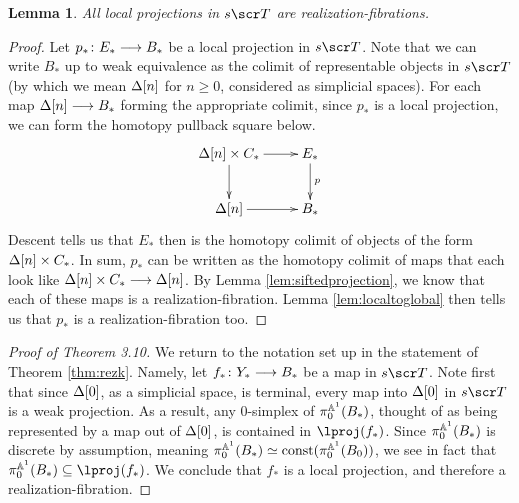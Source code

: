 \documentclass{amsart}
\newtheorem{lem}[thm]{Lemma}
\theoremstyle{definition}
\begin{document}
\begin{lem}
    All local projections in $s\sT$ are realization-fibrations.
\end{lem}
\begin{proof}
    Let $p_* \colon E_* \longrightarrow B_*$ be a local projection in $s\sT$. Note that we can write $B_*$ up to weak equivalence as the colimit of representable objects in $s\sT$ (by which we mean $\Delta[n]$ for $n \geq 0$, considered as simplicial spaces). 
    For each map $\Delta[n] \longrightarrow B_*$ forming the appropriate colimit, since $p_*$ is a local projection, we can form the homotopy pullback square below.
    \[
    \xymatrix{
        \DE[n] \times C_* \ar[r] \ar[d] & E_* \ar[d]^p\\
        \DE[n] \ar[r] & B_*
    }
    \]
    \noindent Descent tells us that $E_*$ then is the homotopy colimit of objects of the form $\Delta[n] \times C_*$. In sum, $p_*$ can be written as the homotopy colimit of maps that each look like $\Delta[n] \times C_* \longrightarrow \Delta[n]$. By Lemma \ref{lem:siftedprojection}, we know that each of these maps is
    a realization-fibration. Lemma \ref{lem:localtoglobal} then tells us that $p_*$ is a realization-fibration too. 
\end{proof}

\begin{proof}[Proof of Theorem 3.10]
    We return to the notation set up in the statement of Theorem \ref{thm:rezk}. Namely, let $f_* \colon Y_* \longrightarrow B_*$ be a map in $s\sT$.
    Note first that since $\Delta[0]$, as a simplicial space, is terminal, every map into $\Delta[0]$ in $s\sT$ is a weak projection. As a result, any 0-simplex of $\pi_0^{\mathbb{A}^1} (B_*)$, thought of as being represented by a map out of $\Delta[0]$, is contained in $\lproj(f_*)$.
    Since $\pi_0^{\mathbb{A}^1} (B_*)$ is discrete by assumption, meaning $\pi_0^{\mathbb{A}^1}(B_*) \simeq \mathrm{const}(\pi_0^{\mathbb{A}^1}(B_0))$, we see in fact that $\pi_0^{\bA^1}(B_*) \subseteq \lproj(f_*)$. We conclude that $f_*$ is a local projection, and therefore a realization-fibration.
\end{proof}
\end{document}
